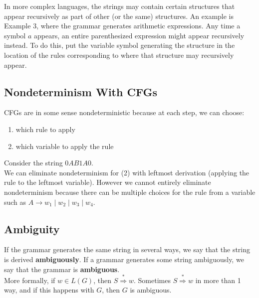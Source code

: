 \documentclass[11pt,a4paper]{article}
\begin{document}
In more complex languages, the strings may contain certain structures that appear recursively as part of other (or the same) structures.
An example is Example 3, where the grammar generates arithmetic expressions. Any time a symbol $a$ appears, an entire parenthesized expression might appear recursively instead.
To do this, put the variable symbol generating the structure in the location of the rules corresponding to where that structure may recursively appear.


\subsection{Nondeterminism With CFGs}
CFGs are in some sense nondeterministic because at each step, we can choose:
\begin{enumerate}
    \item which rule to apply
    \item which variable to apply the rule
\end{enumerate}

\begin{example}
    Consider the string $0AB1A0$. \\

    We can eliminate nondeterminism for (2) with leftmost derivation (applying the rule to the leftmost variable).
    However we cannot entirely eliminate nondeterminism because there can be multiple choices for the rule from a variable such as $A\rightarrow w_1\mid w_2\mid w_3\mid w_4$.
\end{example}

\subsection{Ambiguity}
If the grammar generates the same string in several ways, we say that the string is derived \textbf{ambiguously}.
If a grammar generates some string ambiguously, we say that the grammar is \textbf{ambiguous}. \\

More formally, if $w\in L(G)$, then $S\stackrel{*}{\Rightarrow}w$. Sometimes $S\stackrel{*}{\Rightarrow}w$ in more than 1 way, and if this happens with $G$, then $G$ is ambiguous. \\
\end{document}
